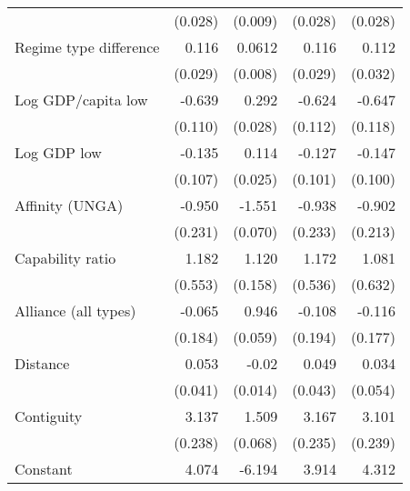\begin{table}[htbp]
\begin{tabular}{l*{4}{D{.}{.}{-1}}}
   &     (0.028)         &     (0.009)         &     (0.028)         &     (0.028)         \\
\addlinespace
Regime type difference&       0.116\sym{***}&      0.0612\sym{***}&       0.116\sym{***}&       0.112\sym{***}\\
   &     (0.029)         &     (0.008)         &     (0.029)         &     (0.032)         \\
\addlinespace
Log GDP/capita low&      -0.639\sym{***}&       0.292\sym{***}&      -0.624\sym{***}&      -0.647\sym{***}\\
   &     (0.110)         &     (0.028)         &     (0.112)         &     (0.118)         \\
\addlinespace
Log GDP low&      -0.135         &       0.114\sym{***}&      -0.127         &      -0.147         \\
   &     (0.107)         &     (0.025)         &     (0.101)         &     (0.100)         \\
\addlinespace
Affinity (UNGA)&      -0.950\sym{***}&      -1.551\sym{***}&      -0.938\sym{***}&      -0.902\sym{***}\\
   &     (0.231)         &     (0.070)         &     (0.233)         &     (0.213)         \\
\addlinespace
Capability ratio&       1.182\sym{*}  &       1.120\sym{***}&       1.172\sym{*}  &       1.081\sym{+}  \\
   &     (0.553)         &     (0.158)         &     (0.536)         &     (0.632)         \\
\addlinespace
Alliance (all types)&     -0.065         &       0.946\sym{***}&      -0.108         &      -0.116         \\
   &     (0.184)         &     (0.059)         &     (0.194)         &     (0.177)         \\
\addlinespace
Distance&      0.053         &     -0.02         &      0.049        &      0.034         \\
   &     (0.041)         &     (0.014)         &     (0.043)         &     (0.054)         \\
\addlinespace
Contiguity&       3.137\sym{***}&       1.509\sym{***}&       3.167\sym{***}&       3.101\sym{***}\\
   &     (0.238)         &     (0.068)         &     (0.235)         &     (0.239)         \\
\addlinespace
Constant&       4.074\sym{+}  &      -6.194\sym{***}&       3.914\sym{+}  &       4.312\sym{*}  \\

\end{tabular}
\end{table}

